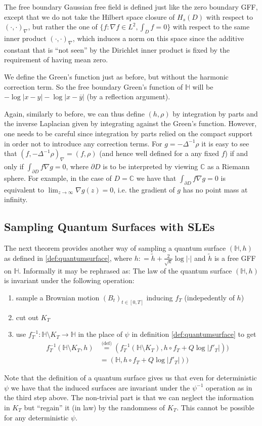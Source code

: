 \documentclass[11pt,reqno]{amsart}
\numberwithin{equation}{section}
\newcommand{\eqbydef}{\mathrel{\stackrel{\text{(def)}}{=}}}
\newcommand{\deq}{\mathrel{\mathop:}=}
\begin{document}
The free boundary Gaussian free field is defined just like the zero boundary GFF, except that we do not take the Hilbert space closure of $H_s(D)$ with respect to $(\cdot,\cdot)_\nabla$, but rather the one of $\{f:\nabla f\in L^2,\int_D f=0\}$ with respect to the same inner product $(\cdot,\cdot)_\nabla$, which induces a norm on this space since the additive constant that is ``not seen'' by the Dirichlet inner product is fixed by the requirement of having mean zero.

We define the Green's function just as before, but without the harmonic correction term. So the free boundary Green's function of $\mathbb H$ will be $-\log|x-y|-\log|x-\overline y|$ (by a reflection argument).

Again, similarly to before, we can thus define $(h,\rho)$ by integration by parts and the inverse Laplacian given by integrating against the Green's function. However, one needs to be careful since integration by parts relied on the compact support in order not to introduce any correction terms. For $g=-\Delta^{-1}\rho$ it is easy to see that $(f,-\Delta^{-1}\rho)_\nabla=(f,\rho)$ (and hence well defined for a any fixed $f$) if and only if $\int_{\partial D}f\nabla g=0$, where $\partial D$ is to be interpreted by viewing $\mathbb C$ as a Riemann sphere. For example, in the case of $D=\mathbb C$ we have that $\int_{\partial D}f\nabla g=0$ is equivalent to $\lim_{z\rightarrow\infty}\nabla g(z)=0$, i.e. the gradient of $g$ has no point mass at infinity.

\subsection{Sampling Quantum Surfaces with SLEs}
The next theorem provides another way of sampling a quantum surface $(\mathbb H,h)$ as defined in \ref{def:quantumsurface}, where $h\deq \tilde h+\frac{2}{\sqrt\kappa}\log|\cdot|$ and $\tilde h$ is a free GFF on $\mathbb H$. Informally it may be rephrased as:
The law of the quantum surface $(\mathbb H,h)$ is invariant under the following operation:
\begin{enumerate}
	\item sample a Brownian motion $(B_t)_{t\in[0,T]}$ inducing $f_T$ (indepedently of $h$)
	\item cut out $K_T$
	\item use $f_T^{-1}:\mathbb H\setminus K_T\rightarrow\mathbb H$ in the place of $\psi$ in definition \ref{def:quantumsurface} to get \begin{align*}
			f_T^{-1}(\mathbb H\setminus K_T, h)&\eqbydef (f_T^{-1}(\mathbb H\setminus K_T),h\circ f_T+Q\log|f'_T|))\\ &= (\mathbb H,h\circ f_T+Q\log|f'_T|))
		\end{align*}
\end{enumerate}
Note that the definition of a quantum surface gives us that even for deterministic $\psi$ we have that the induced surfaces are invariant under the $\psi^{-1}$ operation as in the third step above. The non-trivial part is that we can neglect the information in $K_T$ but ``regain'' it (in law) by the randomness of $K_T$. This cannot be possible for any deterministic $\psi$.
\end{document}
